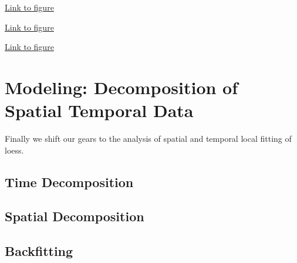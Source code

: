 \begin{framed}
\begin{center}
  \href{../plots/a1950/E4/tmax.mean.std.error.sw.pdf}{Link to figure}
  \label{e4.stderror.sw}
\end{center}
\end{framed}

\begin{framed}
\begin{center}
  \href{../plots/a1950/E4/tmax.mean.absmeans.error.sd.pdf}{Link to figure}
  \label{e4.abserror.sd}
\end{center}
\end{framed}

\begin{framed}
\begin{center}
  \href{../plots/a1950/E4/tmax.mean.std.error.sd.pdf}{Link to figure}
  \label{e4.stderror.sd}
\end{center}
\end{framed}

\section{Modeling: Decomposition of Spatial Temporal Data}

Finally we shift our gears to the analysis of spatial and temporal local fitting 
of loess. 

\subsection{Time Decomposition}

\subsection{Spatial Decomposition}

\subsection{Backfitting}